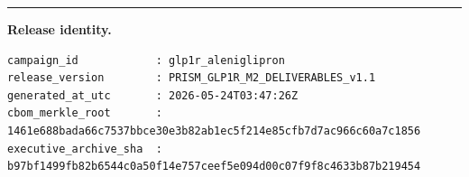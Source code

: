 \documentclass[11pt,a4paper]{article}
\begin{document}
\vspace{8mm}
\hrule
\vspace{2mm}
\begin{flushleft}\small
\textbf{Release identity.}\\
\end{flushleft}
\begin{lstlisting}[caption={Release identity (verbatim)}]
campaign_id            : glp1r_aleniglipron
release_version        : PRISM_GLP1R_M2_DELIVERABLES_v1.1
generated_at_utc       : 2026-05-24T03:47:26Z
cbom_merkle_root       : 1461e688bada66c7537bbce30e3b82ab1ec5f214e85cfb7d7ac966c60a7c1856
executive_archive_sha  : b97bf1499fb82b6544c0a50f14e757ceef5e094d00c07f9f8c4633b87b219454
\end{lstlisting}
\end{document}
